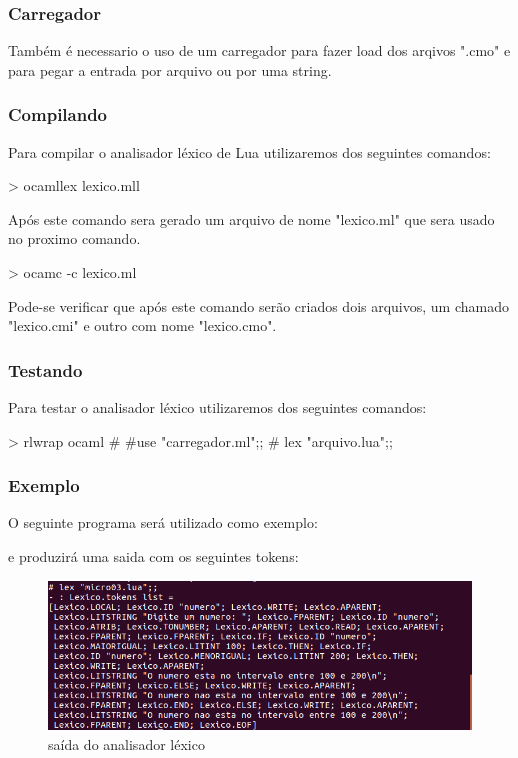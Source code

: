 \documentclass[12pt,a4paper]{report}
\begin{document}
\subsubsection{Carregador}

Também é necessario o uso de um carregador para fazer load dos arqivos ".cmo" e para pegar a entrada por arquivo ou por uma string.




\subsubsection{Compilando}

Para compilar o analisador léxico de Lua utilizaremos dos seguintes comandos:

\begin{terminal}
> ocamllex lexico.mll
\end{terminal}
Após este comando sera gerado um arquivo de nome "lexico.ml" que sera usado no proximo comando.

\begin{terminal}
> ocamc -c lexico.ml
\end{terminal}

Pode-se verificar que após este comando serão criados dois arquivos, um chamado "lexico.cmi" e outro com nome "lexico.cmo".


\subsubsection{Testando}

Para testar o analisador léxico utilizaremos dos seguintes comandos:

\begin{terminal}
> rlwrap ocaml
# #use "carregador.ml";;
# lex "arquivo.lua";;
\end{terminal}

\subsubsection{Exemplo}

O seguinte programa será utilizado como exemplo:



e produzirá uma saida com os seguintes tokens:

\begin{figure}[!htb]
\centering
\includegraphics[scale=0.64]{Imagens/img10.png}
\caption{saída do analisador léxico}
\label{img10}
\end{figure}
\end{document}
